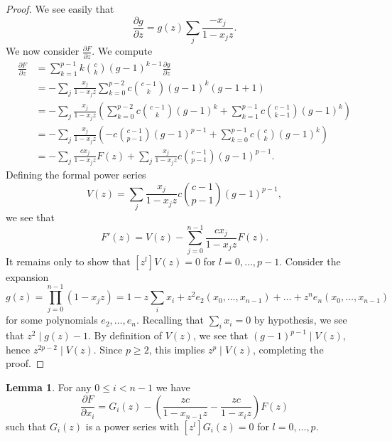 \documentclass{amsart}
\numberwithin{equation}{section}
\theoremstyle{definition}
\newtheorem{lemma}[theorem]{Lemma}
\begin{document}
\begin{proof}
We see easily that 
\[
\frac{\partial g}{\partial z} = g(z) \sum_j \frac{-x_j}{1-x_jz}.
\]
We now consider $\frac{\partial F}{\partial z}$. We compute
\begin{align*}
\frac{\partial F}{\partial z}%
&=\sum_{k=1}^{p-1}k\binom{c}{k}(g-1)^{k-1}\frac{\partial g}{\partial z}\\
&=-\sum_j \frac{x_j}{1-x_jz}\sum_{k=0}^{p-2}c\binom{c-1}{k}(g-1)^{k}(g-1+1)\\
&=-\sum_j \frac{x_j}{1-x_jz}\left(\sum_{k=0}^{p-2}c\binom{c-1}{k}(g-1)^{k}+\sum_{k=1}^{p-1}c\binom{c-1}{k-1}(g-1)^{k}\right)\\
&=-\sum_j \frac{x_j}{1-x_jz}\left(-c\binom{c-1}{p-1}(g-1)^{p-1}+\sum_{k=0}^{p-1}c\binom{c}{k}(g-1)^{k}\right)\\
&=-\sum_j \frac{cx_j}{1-x_jz}F(z)+\sum_j \frac{x_j}{1-x_jz}c\binom{c-1}{p-1}(g-1)^{p-1}.
\end{align*}
Defining the formal power series
\[
V(z)=\sum_j \frac{x_j}{1-x_jz}c\binom{c-1}{p-1}(g-1)^{p-1},
\]
we see that 
\[
F'(z) = V(z) - \sum_{j=0}^{n-1} \frac{cx_j}{1-x_jz} F(z).
\]
It remains only to show that $[z^l]V(z)=0$ for $l=0,\dots,p-1$.  Consider the expansion 
\[
g(z)=\prod_{j=0}^{n-1} (1-x_jz) = 1-z\sum_i x_i+z^2e_2(x_0, \ldots, x_{n - 1})+\dots+z^ne_n(x_0, \ldots, x_{n - 1})
\]
for some polynomials $e_2, \ldots, e_n$.  Recalling that $\sum_i x_i=0$ by hypothesis, we see that $z^2 \mid g(z)-1$. By definition of $V(z)$, we see that $(g-1)^{p-1} \mid V(z)$, hence $z^{2p-2} \mid V(z)$. Since $p \ge 2$, this implies $z^p \mid V(z)$, completing the proof.
\end{proof}

\begin{lemma}\label{lem:dFdxi} For any $0 \le i < n-1$ we have 
\[
\frac{\partial F}{\partial x_i} = G_i(z) - \left(\frac{zc}{1-x_{n-1}z}-\frac{zc}{1-x_iz}\right)F(z)
\]
such that $G_i(z)$ is a power series with $[z^l]G_i(z)=0$ for $l=0,\dots,p$. 
\end{lemma}
\end{document}
